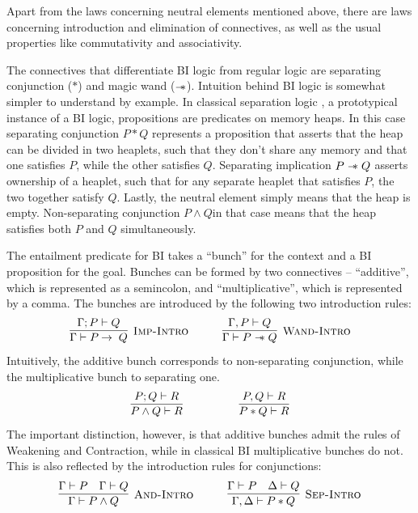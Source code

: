 Apart from the laws concerning neutral elements mentioned above, there are laws concerning introduction and elimination of connectives, as well as the usual properties like commutativity and associativity.

The connectives that differentiate BI logic from regular logic are separating conjunction (\(*\)) and magic wand (\(\mathrel{-\mkern-6mu*}\)).
Intuition behind BI logic is somewhat simpler to understand by example.
In classical separation logic \cite{reynoldsSeparationLogicLogic2002, ohearnLocalReasoningPrograms2001}, a prototypical instance of a BI logic, propositions are predicates on memory heaps.
In this case separating conjunction \(P \ast Q\) represents a proposition that asserts that the heap can be divided in two heaplets, such that they don't share any memory and that one satisfies \(P\), while the other satisfies \(Q\).
Separating implication \(P \mathrel{-\mkern-6mu*} Q\) asserts ownership of a heaplet, such that for any separate heaplet that satisfies \(P\), the two together satisfy \(Q\).
Lastly, the neutral element \emp simply means that the heap is empty.
Non-separating conjunction \(P \wedge Q \)in that case means that the heap satisfies both \(P\) and \(Q\) simultaneously.

The entailment predicate for BI takes a ``bunch'' for the context and a BI proposition for the goal.
Bunches can be formed by two connectives -- ``additive'', which is represented as a semincolon, and ``multiplicative'', which is represented by a comma.
The bunches are introduced by the following two introduction rules:
\begin{equation*}
  \infer[\textsc{Imp-Intro}]
        {\Gamma \vdash P \imp Q}
        {\Gamma ; P \vdash Q}
  \quad \quad \quad
  \infer[\textsc{Wand-Intro}]
        {\Gamma \vdash P \wand Q}
        {\Gamma , P \vdash Q}
\end{equation*}
Intuitively, the additive bunch corresponds to non-separating conjunction, while the multiplicative bunch to separating one.
\begin{equation*}
  \infer{P \wedge Q \vdash R}
        {P ; Q \vdash R}
  \quad \quad \quad \quad \quad
  \infer{P \ast Q \vdash R}
        {P, Q \vdash R}
\end{equation*}
The important distinction, however, is that additive bunches admit the rules of Weakening and Contraction, while in classical BI multiplicative bunches do not.
This is also reflected by the introduction rules for conjunctions:
\begin{equation*}
  \infer[\textsc{And-Intro}]
        {\Gamma \vdash P \wedge Q}
        {\Gamma \vdash P &
         \Gamma \vdash Q }
  \quad \quad \quad
  \infer[\textsc{Sep-Intro}]
        {\Gamma, \Delta \vdash P \ast Q}
        {\Gamma \vdash P &
         \Delta \vdash Q }
\end{equation*}

